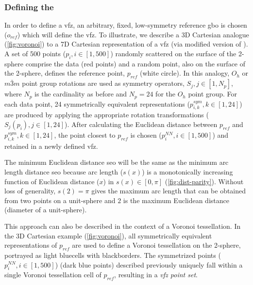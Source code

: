 \documentclass[preprint,12pt]{elsarticle}
\newcommand{\startpt}{red points}
\newcommand{\sympt}{dark blue points}
\newcommand{\refpt}{white circle}
\newcommand{\vbordercolor}{black}
\newcommand{\vcellcolor}{light blue}
\begin{document}
\subsubsection{Defining the }
\label{sec:methods:vfz}


In order to define a \gls{vfz}, an arbitrary, fixed, low-symmetry reference \gls{gbo} is chosen ($o_{ref}$) which will define the \gls{vfz}. To illustrate, we describe a 3D Cartesian analogue (\cref{fig:voronoi}) to a 7D Cartesian representation of a \gls{vfz} (via modified version of \cite{luongVoronoiSphere2020}). A set of \num{500} points ($p_i, i\in[1,500]$) randomly scattered on the surface of the 2-sphere comprise the data (\startpt) and a random point, also on the surface of the 2-sphere, defines the reference point, $p_{ref}$ (\refpt). In this analogy, $O_h$ or $m\bar{3}m$ point group rotations are used as symmetry operators, $S_j,j\in[1,N_p]$, where $N_p$ is the cardinality as before and $N_p = 24$ for the $O_h$  point group. For each data point, \num{24} symmetrically equivalent representations ($p^{sym}_{i,k},k\in[1,24]$) are produced by applying the appropriate rotation transformations ($S_j(p_i),j\in[1,24]$). After calculating the Euclidean distance between $p_{ref}$ and $p^{sym}_{i,k},k\in[1,24]$, the point closest to $p_{ref}$ is chosen ($p^{NN}_i,i\in[1,500]$) and retained in a newly defined \gls{vfz}.

The minimum Euclidean distance \gls{seo} will be the same as the minimum arc length distance \gls{seo} because arc length ($s(x)$) is a monotonically increasing function of Euclidean distance ($x$) in $s(x)\in[0,\pi]$ (\cref{fig:dist-parity}). Without loss of generality, $s(2)=\pi$ gives the maximum arc length that can be obtained from two points on a unit-sphere and $2$ is the maximum Euclidean distance (diameter of a unit-sphere).

This approach can also be described in the context of a Voronoi tessellation. In the 3D Cartesian example (\cref{fig:voronoi}), all symmetrically equivalent representations of $p_{ref}$ are used to define a Voronoi tessellation on the 2-sphere, portrayed as \vcellcolor cells with \vbordercolor borders. The symmetrized points ($p^{NN}_i,i\in[1,500]$) (\sympt) described previously uniquely fall within a single Voronoi tessellation cell of $p_{ref}$, resulting in a \textit{\gls{vfz} point set}.
\end{document}
